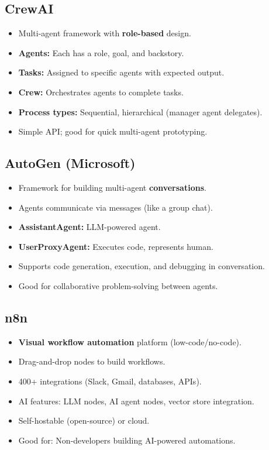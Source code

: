 \documentclass[11pt,a4paper]{article}
\begin{document}
\subsection{CrewAI}
\begin{itemize}[nosep]
  \item Multi-agent framework with \textbf{role-based} design.
  \item \textbf{Agents:} Each has a role, goal, and backstory.
  \item \textbf{Tasks:} Assigned to specific agents with expected output.
  \item \textbf{Crew:} Orchestrates agents to complete tasks.
  \item \textbf{Process types:} Sequential, hierarchical (manager agent delegates).
  \item Simple API; good for quick multi-agent prototyping.
\end{itemize}

\subsection{AutoGen (Microsoft)}
\begin{itemize}[nosep]
  \item Framework for building multi-agent \textbf{conversations}.
  \item Agents communicate via messages (like a group chat).
  \item \textbf{AssistantAgent:} LLM-powered agent.
  \item \textbf{UserProxyAgent:} Executes code, represents human.
  \item Supports code generation, execution, and debugging in conversation.
  \item Good for collaborative problem-solving between agents.
\end{itemize}

\subsection{n8n}
\begin{itemize}[nosep]
  \item \textbf{Visual workflow automation} platform (low-code/no-code).
  \item Drag-and-drop nodes to build workflows.
  \item 400+ integrations (Slack, Gmail, databases, APIs).
  \item AI features: LLM nodes, AI agent nodes, vector store integration.
  \item Self-hostable (open-source) or cloud.
  \item Good for: Non-developers building AI-powered automations.
\end{itemize}
\end{document}
